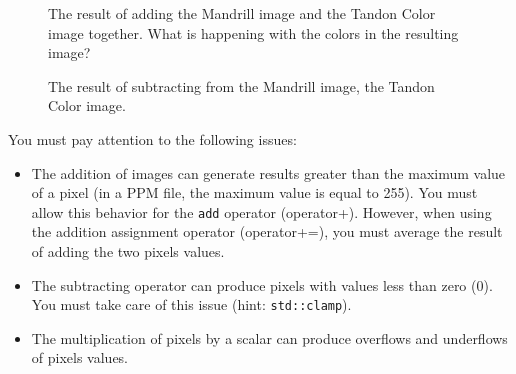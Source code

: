 \documentclass[11pt]{article}
\begin{document}
\begin{figure}[t]
  \centering
  \caption{The result of adding the Mandrill image and the Tandon Color image together. What is happening with the colors in the resulting image?}
  \label{fig:adding}
  \vspace*{-3.5mm}  
\end{figure}

\begin{figure}[t]
  \centering
  \caption{The result of subtracting from the Mandrill image, the Tandon Color image.}
  \label{fig:minus}
  \vspace*{-3.5mm}  
\end{figure}

You must pay attention to the following issues:
\begin{itemize}
\item The addition of images can generate results greater than the maximum value of a pixel (in a PPM file, the maximum value is equal to 255). You must allow this behavior for the \texttt{add} operator 
(operator+). However, when using the addition assignment operator (operator+=), you must average the result of adding the two pixels values.
\item The subtracting operator can produce pixels with values less than zero (0). You must take care of this issue (hint: \texttt{std::clamp}).
\item The multiplication of pixels by a scalar can produce overflows and underflows of pixels values.
\end{itemize}
\end{document}
